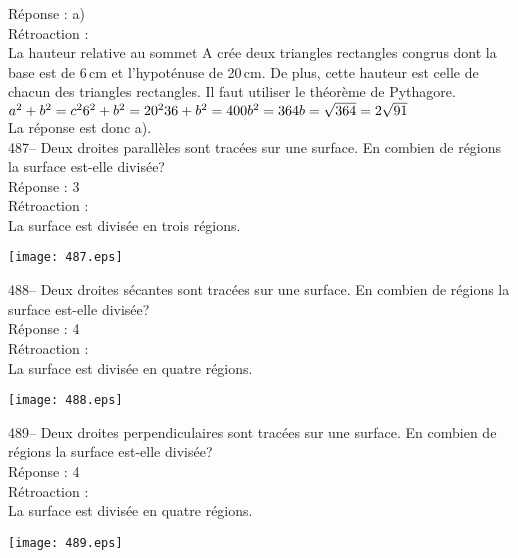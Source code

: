 ﻿\documentclass[letterpaper, 12pt]{article}
\begin{document}
R\'eponse : a)\\

R\'etroaction : \\
La hauteur relative au sommet A cr\'ee deux triangles rectangles congrus
dont la base est de 6\,cm et l'hypot\'enuse de 20\,cm.  De plus, cette
hauteur est celle de chacun des triangles rectangles.  Il faut utiliser le
th\'eor\`eme de Pythagore.\\
$a^{2}+b^{2}=c^{2}\\
6^{2}+b^{2}=20^{2}\\
36+b^{2}=400\\
b^{2}=364\\
b=\sqrt{364}=2\sqrt{91}$\\
La r\'eponse est donc a).\\

487-- Deux droites parall\`eles sont trac\'ees sur une surface.  En combien
de r\'egions la surface est-elle divis\'ee?\\

R\'eponse : 3\\

R\'etroaction : \\
La surface est divis\'ee en trois r\'egions.\\
\begin{center}
\texttt{[image: 487.eps]}
\end{center}

488-- Deux droites s\'ecantes sont trac\'ees sur une surface.  En combien de
r\'egions la surface est-elle divis\'ee?\\

R\'eponse : 4\\

R\'etroaction : \\
La surface est divis\'ee en quatre r\'egions.\\
\begin{center}
\texttt{[image: 488.eps]}
\end{center}

489-- Deux droites perpendiculaires sont trac\'ees sur une surface.  En
combien de r\'egions la surface est-elle divis\'ee?\\

R\'eponse : 4\\

R\'etroaction :\\
La surface est divis\'ee en quatre r\'egions.\\
\begin{center}
\texttt{[image: 489.eps]}
\end{center}
\end{document}
